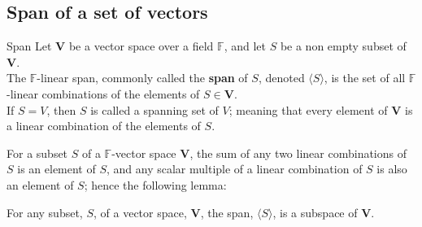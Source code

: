 \documentclass[a4paper, 9pt]{extarticle}
\begin{document}
\subsection{Span of a set of vectors}
\begin{definitionbox}{Span}{}
  Let $\mathbf{V}$ be a vector space over a field $\mathbb{F}$, and let $S$ be a non empty subset of $\mathbf{V}$. \\[2ex]
  The $\mathbb{F}$-linear span, commonly called the \textbf{span} of $S$, denoted $\langle S \rangle$, is the set of all $\mathbb{F}$-linear combinations of the elements of $S \in \mathbf{V}$. \\[2ex]
  If $S=V$, then $S$ is called a spanning set of $V$; meaning that every element of $\mathbf{V}$ is a linear combination of the elements of $S$.
\end{definitionbox}
For a subset $S$ of a $\mathbb{F}$-vector space $\mathbf{V}$, the sum of any two linear combinations of $S$ is an element of $S$, and any scalar multiple of a linear combination of $S$ is also an element of $S$; hence the following lemma:
\begin{lemmabox}{}{}
  For any subset, $S$, of a vector space, $\mathbf{V}$, the span, $\langle S \rangle$, is a subspace of $\mathbf{V}$.
\end{lemmabox}
\end{document}
